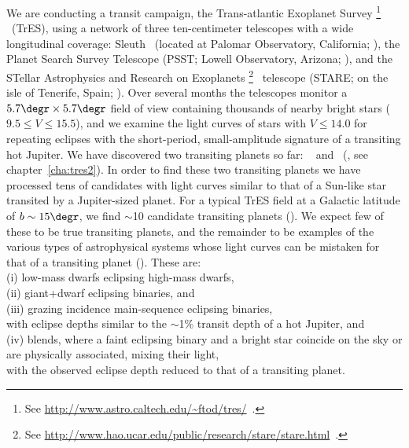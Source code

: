We are conducting a transit campaign, the {Trans-atlantic Exoplanet Survey}%
\footnote{See \url{http://www.astro.caltech.edu/\~ftod/tres/}\ .}%
\ (TrES), using a network of three ten-centimeter telescopes with a wide longitudinal coverage:
{Sleuth}%
\footnotemark[\value{footnote}]%
\ (located at Palomar Observatory, California; \citealt{ODonovan_Charbonneau_Kotredes:AIP:2004a}), the Planet Search Survey Telescope (PSST; Lowell Observatory, Arizona; \citealt{Dunham_Mandushev_Taylor:pasp:2004a}),
and the STellar Astrophysics and Research on Exoplanets%
\footnote{See \url{http://www.hao.ucar.edu/public/research/stare/stare.html}\ .}%
\ telescope ({STARE}; on the isle of Tenerife, Spain; \citealt{Alonso_Deeg_Brown:an:2004a}). Over several months the telescopes monitor a $5.7\degr \times 5.7\degr$ field of view containing thousands of nearby bright stars ($9.5\leq V \leq 15.5$), and we examine the light curves of stars with $V\leq14.0$ for repeating eclipses with the short-period, small-amplitude signature of a transiting hot Jupiter. We have discovered two transiting planets so far: \tresOne\ \citep{Alonso_Brown_Torres:apjl:2004a} and \tresTwo\ (\citealp{ODonovan_Charbonneau_Mandushev:apjl:2006a}, see chapter~\ref{cha:tres2}). In order to find these two transiting planets we have processed tens of candidates with light curves similar to that of a Sun-like star transited by a Jupiter-sized planet. For a typical TrES field at a Galactic latitude of $b\sim15\degr$, we find $\sim$10 candidate transiting planets (\citealp[see, e.g.,][]{Dunham_Mandushev_Taylor:pasp:2004a}). We expect few of these to be true transiting planets, and the remainder to be examples of the various types of astrophysical systems whose light curves can be mistaken for that of a transiting planet (\citealp[see, e.g.,][]{Brown:apjl:2003a, Charbonneau_Brown_Dunham:AIP:2004a}). These are: \\
\indent (i) low-mass dwarfs eclipsing high-mass dwarfs, \\
(ii) giant+dwarf eclipsing binaries, and \\
(iii) grazing incidence main-sequence eclipsing binaries, \\
with eclipse depths similar to the $\sim$1\% transit depth of a hot Jupiter, and \\
(iv) blends, where a faint eclipsing binary and a bright star coincide on the sky or are physically associated, mixing their light, \\
with the observed eclipse depth reduced to that of a transiting planet.

